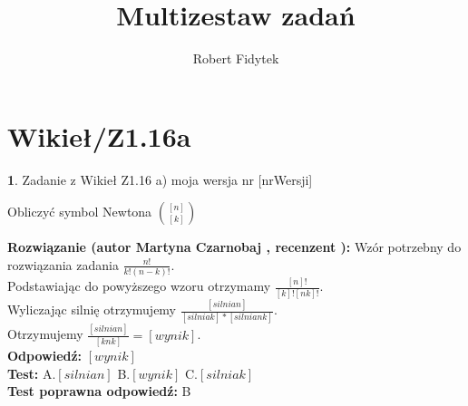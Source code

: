 \documentclass[12pt, a4paper]{article}
\title{Multizestaw zadań}
\author{Robert Fidytek}
\date{}
\theoremstyle{definition} %
\newtheorem{zad}{}
\newcommand{\kategoria}[1]{\section{#1}} %
\newcommand{\zadStart}[1]{\begin{zad}#1\newline} %
\newcommand{\zadStop}{\end{zad}}   %
\newcommand{\rozwStart}[2]{\noindent \textbf{Rozwiązanie (autor #1 , recenzent #2): }\newline} %
\newcommand{\rozwStop}{\newline}                                            %
\newcommand{\odpStart}{\noindent \textbf{Odpowiedź:}\newline}    %
\newcommand{\odpStop}{\newline}                                             %
\newcommand{\testStart}{\noindent \textbf{Test:}\newline} %
\newcommand{\testStop}{\newline} %
\newcommand{\kluczStart}{\noindent \textbf{Test poprawna odpowiedź:}\newline} %
\newcommand{\kluczStop}{\newline} %
\begin{document}
\maketitle


\kategoria{Wikieł/Z1.16a}
\zadStart{Zadanie z Wikieł Z1.16 a) moja wersja nr [nrWersji]}


Obliczyć symbol Newtona ${[n]}\choose{[k]}$
\zadStop
\rozwStart{Martyna Czarnobaj}{}
Wzór potrzebny do rozwiązania zadania $ \frac{n!}{k!(n-k)!} $.\\
Podstawiając do powyższego wzoru otrzymamy $ \frac{[n]!}{[k]![nk]!} $.\\
Wyliczając silnię otrzymujemy $ \frac{[silnian]}{[silniak]*[silniank]} $.\\
Otrzymujemy $ \frac{[silnian]}{[knk]} = [wynik] $.\\
\rozwStop
\odpStart
$  [wynik]  $\\
\odpStop
\testStart
A.$ [silnian]  $
B.$ [wynik] $
C.$ [silniak] $\\
\testStop
\kluczStart
B
\kluczStop
\end{document}
